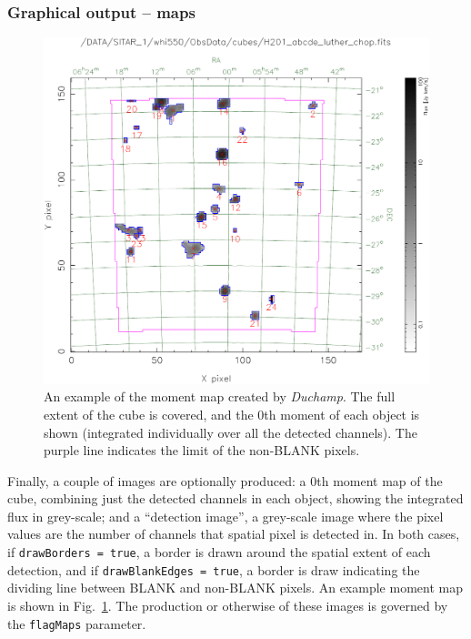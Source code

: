 \documentclass[12pt,a4paper]{article}
\newcommand{\duchamp}{\emph{Duchamp}}
\begin{document}
\subsubsection{Graphical output -- maps}

\begin{figure}[!t]
\begin{center}
\includegraphics[width=\textwidth]{example_moment_map}
\end{center}
\caption{\footnotesize An example of the moment map created by
  \duchamp. The full extent of the cube is covered, and the 0th moment
  of each object is shown (integrated individually over all the
  detected channels). The purple line indicates the limit of the
  non-BLANK pixels.}
\label{fig-moment}
\end{figure}

Finally, a couple of images are optionally produced: a 0th moment map
of the cube, combining just the detected channels in each object,
showing the integrated flux in grey-scale; and a ``detection image'',
a grey-scale image where the pixel values are the number of channels
that spatial pixel is detected in. In both cases, if
\texttt{drawBorders = true}, a border is drawn around the spatial
extent of each detection, and if \texttt{drawBlankEdges = true}, a
border is draw indicating the dividing line between BLANK and
non-BLANK pixels. An example moment map is shown in
Fig.~\ref{fig-moment}.  The production or otherwise of these images is
governed by the \texttt{flagMaps} parameter.
\end{document}
